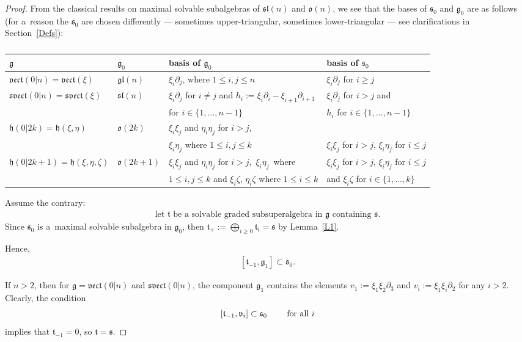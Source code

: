 \documentclass[10pt,a4paper]{amsart}
\newcommand{\del}{\partial}
\newcommand {\fg} {{\mathfrak{g}}} %
\newcommand {\fgl} {{\mathfrak{gl}}} %
\newcommand {\fh} {{\mathfrak{h}}}
\newcommand {\fo} {{\mathfrak{o}}}
\newcommand {\fs} {{\mathfrak{s}}}
\newcommand {\fsl} {{\mathfrak{sl}}}
\newcommand {\fsvect} {{\mathfrak{svect}}}
\newcommand {\ft} {{\mathfrak{t}}}
\newcommand {\fv} {{\mathfrak{v}}} %
\newcommand {\fvect} {{\mathfrak{vect}}} %
\newcommand {\<} [2] {{\left.\vphantom{#2}\right.^{#1\!}\!{#2}}}
\numberwithin{equation}{section}
\begin{document}
\begin{proof} From the classical results on maximal solvable subalgebras of $\fsl(n)$ and $\fo(n)$, we see that the bases of $\fs_0$ and $\fg_0$ are as follows (for a~reason the $\fs_0$ are chosen differently --- sometimes upper-triangular, sometimes lower-triangular --- see clarifications in Section~\ref{Defs}):

\begin{table}[!ht]\centering\renewcommand{\arraystretch}{1.2}
\footnotesize

\begin{tabular}{|l |l |l |l|}
\hline
$\fg$&$\fg_0$&basis of $\fg_0$&basis of $\fs_0$\\
\hline
$\fvect(0|n)=\fvect(\xi)$&$\fgl(n)$&$\xi_i\del_j$, where $1\leq i, j\leq n$&$\xi_i\del_j$ for $i\geq j$\\
\hline
$\fsvect(0|n)=\fsvect(\xi)$&$\fsl(n)$&$\xi_i\del_j$ for $i\neq j$ and $h_i:=\xi_i\del_i-\xi_{i+1}\del_{i+1}$&$\xi_i\del_j$ for $i> j$ and\\
 &&for $i\in\{1, \dots, n-1\}$&$h_i$ for $i\in\{1, \dots, n-1\}$\\
\hline
$\fh(0|2k)=\fh(\xi, \eta)$&$\fo(2k)$&$\xi_i\xi_j$ and $\eta_i\eta_j$ for $i> j$,&\\
&& $\xi_i\eta_j$ where
$1\leq i, j\leq k$&$\xi_i\xi_j$ for $i>j$,  $\xi_i\eta_j$ for $i\leq j$\\
\hline
$\fh(0|2k+1)=\fh(\xi, \eta, \zeta)$&$\fo(2k+1)$&$\xi_i\xi_j$ and $\eta_i\eta_j$ for $i> j$,\ $\xi_i\eta_j$\ where &$\xi_i\xi_j$ for $i>j$,  $\xi_i\eta_j$ for $i\leq j$ \\
 &&$1\leq i, j\leq k$ and $\xi_i\zeta$,  $\eta_i\zeta$ where $1\leq i\leq k$&and $\xi_i\zeta$ for $i\in\{1, \dots, k\}$\\
\hline
\end{tabular}
\caption{}\label{tab3}
\end{table}

Assume the contrary:
\begin{gather}\label{ft}
\text{let $\ft$ be a~solvable graded subsuperalgebra in $\fg$ containing $\fs$.}
\end{gather}
Since $\fs_0$ is a~maximal solvable subalgebra in $\fg_0$, then $\ft_+:=\bigoplus_{i\geq 0} \ft_i=\fs$ by Lemma~\ref{L1}.

Hence,
\begin{gather}\label{*}
[\ft_{-1}, \fg_1]\subset \fs_0.
\end{gather}

If $n>2$, then for $\fg=\fvect(0|n)$ and $\fsvect(0|n)$, the component $\fg_1$ contains the elements $v_1:=\xi_1\xi_2\del_3$ and $v_i:=\xi_1\xi_i\del_2$ for any $i>2$.
Clearly, the condition
\begin{gather}\label{test}
\text{$[\ft_{-1}, \fv_i]\subset \fs_0$ \qquad for all $i$}
\end{gather}
implies that $\ft_{-1}=0$, so $\ft=\fs$.


\end{proof}
\end{document}
